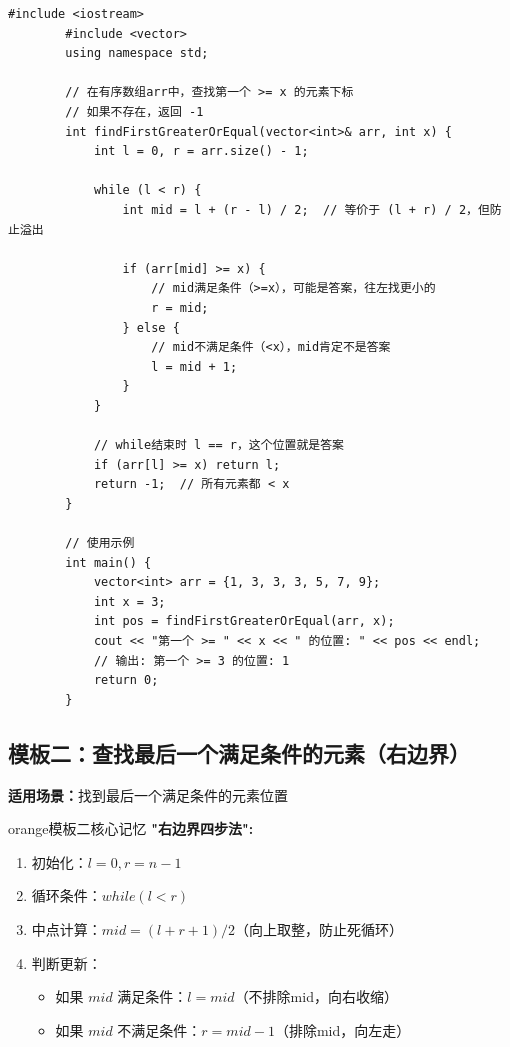 \documentclass[12pt,a4paper]{article}
\begin{document}
	\begin{lstlisting}[caption={模板1：查找第一个 >= x 的元素}]
		#include <iostream>
		#include <vector>
		using namespace std;
		
		// 在有序数组arr中，查找第一个 >= x 的元素下标
		// 如果不存在，返回 -1
		int findFirstGreaterOrEqual(vector<int>& arr, int x) {
			int l = 0, r = arr.size() - 1;
			
			while (l < r) {
				int mid = l + (r - l) / 2;  // 等价于 (l + r) / 2，但防止溢出
				
				if (arr[mid] >= x) {
					// mid满足条件（>=x），可能是答案，往左找更小的
					r = mid;
				} else {
					// mid不满足条件（<x），mid肯定不是答案
					l = mid + 1;
				}
			}
			
			// while结束时 l == r，这个位置就是答案
			if (arr[l] >= x) return l;
			return -1;  // 所有元素都 < x
		}
		
		// 使用示例
		int main() {
			vector<int> arr = {1, 3, 3, 3, 5, 7, 9};
			int x = 3;
			int pos = findFirstGreaterOrEqual(arr, x);
			cout << "第一个 >= " << x << " 的位置: " << pos << endl;
			// 输出: 第一个 >= 3 的位置: 1
			return 0;
		}
	\end{lstlisting}
	
	\subsection{模板二：查找最后一个满足条件的元素（右边界）}
	
	\textbf{适用场景：}找到最后一个满足条件的元素位置
	
	\begin{mybox}{orange}{模板二核心记忆}
		\textbf{"右边界四步法":}
		\begin{enumerate}
			\item 初始化：$l = 0, r = n - 1$
			\item 循环条件：$while(l < r)$
			\item 中点计算：$mid = (l + r + 1) / 2$（向上取整，防止死循环）
			\item 判断更新：
			\begin{itemize}
				\item 如果 $mid$ 满足条件：$l = mid$（不排除mid，向右收缩）
				\item 如果 $mid$ 不满足条件：$r = mid - 1$（排除mid，向左走）
			\end{itemize}
		\end{enumerate}
	\end{mybox}
	
\end{document}
